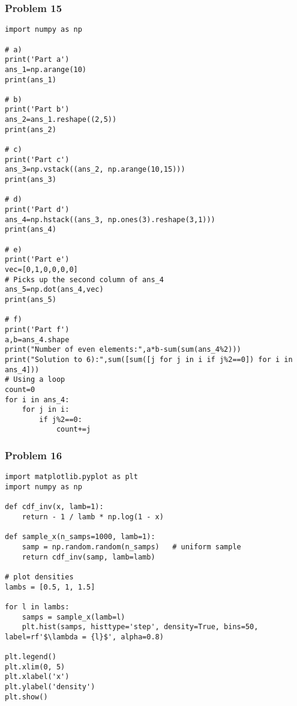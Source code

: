 \documentclass{harvardml}
\theoremstyle{definition}
\theoremstyle{plain}
\begin{document}
\subsubsection*{Problem 15}
\begin{verbatim}
import numpy as np

# a)
print('Part a')
ans_1=np.arange(10)
print(ans_1)

# b)
print('Part b')
ans_2=ans_1.reshape((2,5))
print(ans_2)

# c)
print('Part c')
ans_3=np.vstack((ans_2, np.arange(10,15)))
print(ans_3)

# d)
print('Part d')
ans_4=np.hstack((ans_3, np.ones(3).reshape(3,1)))
print(ans_4)

# e)
print('Part e')
vec=[0,1,0,0,0,0]
# Picks up the second column of ans_4
ans_5=np.dot(ans_4,vec)
print(ans_5)

# f)
print('Part f')
a,b=ans_4.shape
print("Number of even elements:",a*b-sum(sum(ans_4%2)))
print("Solution to 6):",sum([sum([j for j in i if j%2==0]) for i in ans_4]))
# Using a loop
count=0
for i in ans_4:
    for j in i:
        if j%2==0:
            count+=j

\end{verbatim}

\subsubsection*{Problem 16}
\begin{verbatim}
import matplotlib.pyplot as plt
import numpy as np

def cdf_inv(x, lamb=1):
    return - 1 / lamb * np.log(1 - x)

def sample_x(n_samps=1000, lamb=1):
    samp = np.random.random(n_samps)   # uniform sample
    return cdf_inv(samp, lamb=lamb)
    
# plot densities
lambs = [0.5, 1, 1.5]

for l in lambs:
    samps = sample_x(lamb=l)
    plt.hist(samps, histtype='step', density=True, bins=50, label=rf'$\lambda = {l}$', alpha=0.8)

plt.legend()
plt.xlim(0, 5)
plt.xlabel('x')
plt.ylabel('density')
plt.show()
\end{verbatim}
\end{document}
